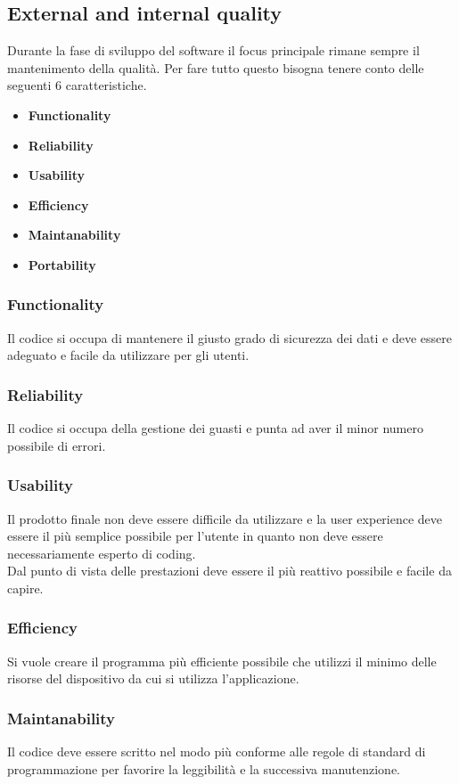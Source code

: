 \documentclass{article}
\begin{document}
\subsection{External and internal quality}
Durante la fase di sviluppo del software il focus principale rimane sempre il mantenimento della qualità.
Per fare tutto questo bisogna tenere conto delle seguenti 6 caratteristiche.
\begin{itemize}
    \item \textbf{Functionality} 
    \item \textbf{Reliability} 
    \item \textbf{Usability} 
    \item \textbf{Efficiency} 
    \item \textbf{Maintanability} 
    \item \textbf{Portability} 
\end{itemize}

\subsubsection{Functionality}
Il codice si occupa di mantenere il giusto grado di sicurezza dei dati e deve essere adeguato e facile
da utilizzare per gli utenti.

\subsubsection{Reliability}
Il codice si occupa della gestione dei guasti e punta ad aver il minor numero possibile di errori.

\subsubsection{Usability}
Il prodotto finale non deve essere difficile da utilizzare e la user experience deve essere il più
semplice possibile per l'utente in quanto non deve essere necessariamente esperto di coding.
\\Dal punto di vista delle prestazioni deve essere il più reattivo possibile e facile da capire.

\subsubsection{Efficiency}
Si vuole creare il programma più efficiente possibile che utilizzi il minimo delle risorse del dispositivo
da cui si utilizza l'applicazione.

\subsubsection{Maintanability}
Il codice deve essere scritto nel modo più conforme alle regole di standard di programmazione per favorire
la leggibilità e la successiva manutenzione.
\end{document}
